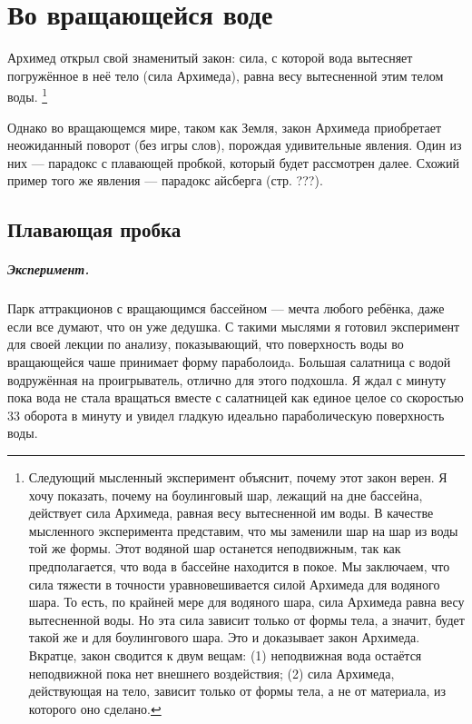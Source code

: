 \chapter{Во вращающейся воде}

Архимед открыл свой знаменитый закон: сила, с которой вода вытесняет погружённое в неё тело (сила Архимеда), равна весу вытесненной этим телом воды.%
\footnote{Следующий мысленный эксперимент объяснит, почему этот закон верен. Я хочу показать, почему на боулинговый шар, лежащий на дне бассейна, действует сила Архимеда, равная весу вытесненной им воды. В качестве мысленного эксперимента представим, что мы заменили шар на шар из воды той же формы. Этот водяной шар останется неподвижным, так как предполагается, что вода в бассейне находится в покое. Мы заключаем, что сила тяжести в точности уравновешивается силой Архимеда для водяного шара. То есть, по крайней мере для водяного шара, сила Архимеда равна весу вытесненной воды. Но эта сила зависит только от формы тела, а значит, будет такой же и для боулингового шара. Это и доказывает закон Архимеда.
Вкратце, закон сводится к двум вещам:
(1) неподвижная вода остаётся неподвижной пока нет внешнего воздействия;
(2) сила Архимеда, действующая на тело, зависит только от формы тела, а не от материала, из которого оно сделано.}

Однако во вращающемся мире, таком как Земля, закон Архимеда приобретает неожиданный поворот (без игры слов), порождая удивительные явления.
Один из них — парадокс с плавающей пробкой, который будет рассмотрен далее.
Схожий пример того же явления — парадокс айсберга (стр. ???).

\section{Плавающая пробка}

\paragraph*{Эксперимент.}
Парк аттракционов с вращающимся бассейном --- мечта любого ребёнка, даже если все думают, что он уже дедушка.
С такими мыслями я готовил эксперимент для своей лекции по анализу, показывающий, что поверхность воды во вращающейся чаше принимает форму параболоидa.
Большая салатница с водой водружённая на проигрыватель, отлично для этого подхошла.
Я ждал с минуту пока вода не стала вращаться вместе с салатницей как единое целое со скоростью 33 оборота в минуту и увидел гладкую идеально параболическую поверхность воды.

